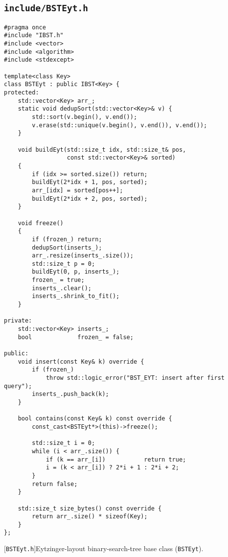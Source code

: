 \subsection{\texttt{include/BSTEyt.h}}
\label{secsec:bsteyt-h}
\begin{lstlisting}
#pragma once
#include "IBST.h"
#include <vector>
#include <algorithm>
#include <stdexcept>

template<class Key>
class BSTEyt : public IBST<Key> {
protected:  
    std::vector<Key> arr_; 
    static void dedupSort(std::vector<Key>& v) {
        std::sort(v.begin(), v.end());
        v.erase(std::unique(v.begin(), v.end()), v.end());
    }

    void buildEyt(std::size_t idx, std::size_t& pos,
                  const std::vector<Key>& sorted)
    {
        if (idx >= sorted.size()) return;
        buildEyt(2*idx + 1, pos, sorted);
        arr_[idx] = sorted[pos++];
        buildEyt(2*idx + 2, pos, sorted);
    }

    void freeze()
    {
        if (frozen_) return;
        dedupSort(inserts_);
        arr_.resize(inserts_.size());
        std::size_t p = 0;
        buildEyt(0, p, inserts_);
        frozen_ = true;
        inserts_.clear();
        inserts_.shrink_to_fit();
    }

private:
    std::vector<Key> inserts_;           
    bool             frozen_ = false;

public:
    void insert(const Key& k) override {
        if (frozen_)
            throw std::logic_error("BST_EYT: insert after first query");
        inserts_.push_back(k);
    }

    bool contains(const Key& k) const override {
        const_cast<BSTEyt*>(this)->freeze();

        std::size_t i = 0;
        while (i < arr_.size()) {
            if (k == arr_[i])           return true;
            i = (k < arr_[i]) ? 2*i + 1 : 2*i + 2;
        }
        return false;
    }

    std::size_t size_bytes() const override {
        return arr_.size() * sizeof(Key);
    }
};
\end{lstlisting}
[\texttt{BSTEyt.h}]{Eytzinger-layout binary-search-tree
base class (\texttt{BSTEyt}).}
\label{lst:bsteyt-h}


